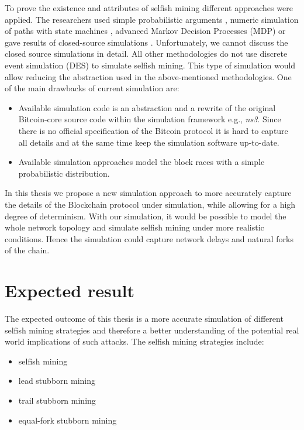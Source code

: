 \documentclass{scrartcl}
\begin{document}
To prove the existence and attributes of selfish mining different approaches were applied.
The researchers used simple probabilistic arguments \cite{eyal2014majority, bahack2013theoretical}, numeric simulation of paths with state machines \cite{gervais2015tampering, nayak2016stubborn}, advanced Markov Decision Processes (MDP) \cite{sapirshtein2016optimal, gervais2016security} or gave results of closed-source simulations \cite{eyal2014majority, sapirshtein2016optimal}.
Unfortunately, we cannot discuss the closed source simulations in detail.
All other methodologies do not use discrete event simulation (DES)
\cite{fishman1978principles} to simulate selfish mining.
This type of simulation would allow reducing the abstraction used in the above-mentioned methodologies.
One of the main drawbacks of current simulation are:
\begin{itemize}
\item Available simulation code is an abstraction and a rewrite of the original   Bitcoin-core source code within the simulation framework e.g., \emph{ns3}.
Since there is no official specification of the Bitcoin protocol it is hard to capture all details and at the same time keep the simulation software up-to-date.
\item Available simulation approaches model the block races with a simple probabilistic distribution.
\end{itemize}

In this thesis we
propose a new simulation approach to more accurately capture the details of the Blockchain protocol under simulation, while allowing for a high degree of determinism.
With our simulation, it would be possible to model the whole network topology and simulate selfish mining under more realistic conditions.
Hence the simulation could capture network delays and natural forks of the chain.

\section{Expected result}
The expected outcome of this thesis is a more accurate simulation of different selfish mining strategies and therefore a better understanding of the potential real world implications of such attacks.
The selfish mining strategies include:
\begin{itemize}
\item selfish mining \cite{eyal2014majority}
\item lead stubborn mining \cite{nayak2016stubborn}
\item trail stubborn mining \cite{nayak2016stubborn}
\item equal-fork stubborn mining \cite{nayak2016stubborn}
\end{itemize}
\end{document}
